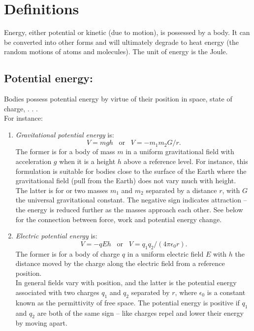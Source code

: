 




\addtolength{\topmargin}{-0.7 cm}
\setlength{\columnsep}{22pt}

\section{Definitions}
Energy, either potential or kinetic (due to motion), is possessed by a body.  It can be converted into other forms and will ultimately degrade to heat energy (the random motions of atoms and molecules).  The unit of energy is the Joule.
\subsection{Potential energy:}Bodies possess potential energy by virtue of their position in space, state of charge, . . .\\
For instance:
\begin{enumerate}
  \item \textit{Gravitational potential energy} is:
\begin{equation*} 
    V = m g h \;\;\; \textrm{or} \;\;\; V = - m_1m_2 G/r.
\end{equation*}
The former is for a body of mass $m$ in a uniform gravitational field with acceleration $g$ when it is a height $h$ above a reference level.  For instance, this formulation is suitable for bodies close to the surface of the Earth where the gravitational field (pull from the Earth) does not vary much with height.\\
The latter is for or two masses $m_1$ and $m_2$ separated by a distance $r$, with $G$ the universal gravitational constant.  The negative sign indicates attraction -- the energy is reduced further as the masses approach each other.  See below for the connection between force, work and potential energy change.
  \item \textit{Electric potential energy} is:
   \begin{equation*} 
   V = - q E h \;\;\; \textrm{or} \;\;\; V = q_1q_2/(4\pi \epsilon_0 r).
\end{equation*} 
The former is for a body of charge $q$ in a uniform electric field $E$ with $h$ the distance moved by the charge along the electric field from a reference position.\\
In general fields vary with position, and the latter is the potential energy associated with two charges $q_1$ and $q_2$ separated by $r$, where $\epsilon_0$ is a constant known as the permittivity of free space.  The potential energy is positive if $q_1$ and $q_2$ are both of the same sign -- like charges repel and lower their energy by moving apart.
\end{enumerate}
